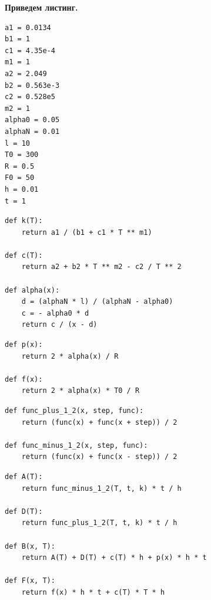 \documentclass[a4paper,14pt]{extreport} %
\begin{document}
\textbf{Приведем листинг. }

\begin{lstlisting}[caption=Заданные параметры]
a1 = 0.0134
b1 = 1
c1 = 4.35e-4
m1 = 1
a2 = 2.049
b2 = 0.563e-3
c2 = 0.528e5
m2 = 1
alpha0 = 0.05
alphaN = 0.01
l = 10
T0 = 300
R = 0.5
F0 = 50
h = 0.01
t = 1
\end{lstlisting}

\begin{lstlisting}[caption=Коэффициенты теплопроводности материала стержня и теплоотдачи при обдуве; теплоемкость]
def k(T):
    return a1 / (b1 + c1 * T ** m1)

def c(T):
    return a2 + b2 * T ** m2 - c2 / T ** 2

def alpha(x):
    d = (alphaN * l) / (alphaN - alpha0)
    c = - alpha0 * d
    return c / (x - d)
\end{lstlisting}

\begin{lstlisting}[caption=Выполненные замены]
def p(x):
    return 2 * alpha(x) / R

def f(x):
    return 2 * alpha(x) * T0 / R
\end{lstlisting}

\begin{lstlisting}[caption=Метод средних для вычисления значения функций]
def func_plus_1_2(x, step, func):
    return (func(x) + func(x + step)) / 2

def func_minus_1_2(x, step, func):
    return (func(x) + func(x - step)) / 2
\end{lstlisting}

\begin{lstlisting}[caption=Функции для нахождения параметров разностной схемы]
def A(T):
    return func_minus_1_2(T, t, k) * t / h

def D(T):
    return func_plus_1_2(T, t, k) * t / h

def B(x, T):
    return A(T) + D(T) + c(T) * h + p(x) * h * t

def F(x, T):
    return f(x) * h * t + c(T) * T * h
\end{lstlisting}
\end{document}
